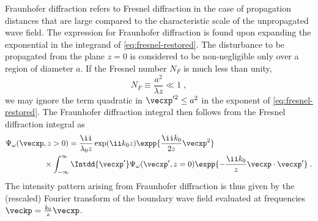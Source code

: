 \documentclass[
twoside,
openright,
titlepage,
numbers=noenddot,
headinclude,
fleqn,
a4paper,
footinclude=true,
cleardoublepage=empty,
abstractoff,
BCOR=5mm,
paper=a4,
fontsize=11pt,
british,ngerman,american,
]{scrreprt}
\begin{document}
Fraunhofer diffraction refers to Fresnel diffraction in the case of
propagation distances that are large compared to the characteristic
scale of the unpropagated wave field.  The expression for Fraunhofer
diffraction is found upon expanding the exponential in the integrand
of \cref{eq:fresnel-restored}.  The disturbance to be propagated from
the plane $z=0$ is considered to be non-negligible only over a region
of diameter $a$.  If the Fresnel number $N_F$ is much less than
unity,
\begin{equation}
  \label{eq:fresnel-number}
  N_F\equiv \frac{a^2}{\lambda z} \ll 1 \;,
\end{equation}
we may ignore the term quadratic in $\vecxp'^2\le a^2$ in the exponent
of \cref{eq:fresnel-restored}.  The Fraunhofer diffraction integral
then follows from the Fresnel diffraction integral as
\begin{equation}
  \label{eq:fraunhofer}
  \begin{split}
  \Psi_\omega(\vecxp&,z>0) =
   \frac{\ii}{\lambda_0 z}\exp(\ii k_0 z)
  \expp{\frac{\ii k_0}{2 z} \vecxp^2}
  \\ &\times\int_{-\infty}^{\infty}\Intdd{\vecxp'}\Psi_\omega(\vecxp',z=0) 
  \expp{-\frac{\ii k_0}{z}\vecxp\cdot\vecxp'} \;.    
  \end{split}
\end{equation}
The intensity pattern arising from Fraunhofer diffraction is thus
given by the (rescaled) Fourier transform of the boundary wave field
evaluated at frequencies $\veckp=\frac{k_0}{z}\vecxp$.
\end{document}
